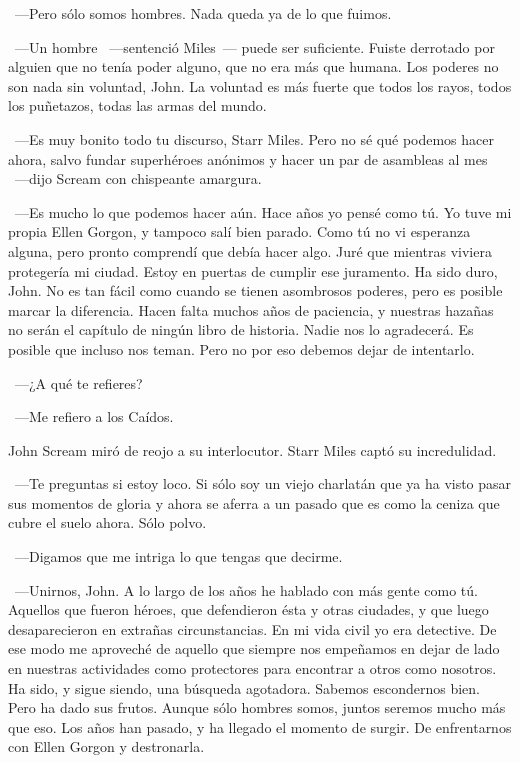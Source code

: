 ~---Pero sólo somos hombres. Nada queda ya de lo que fuimos.

~---Un hombre ~---sentenció Miles~--- puede ser suficiente. Fuiste derrotado por alguien que no tenía poder alguno, que no era más que humana. Los poderes no son nada sin voluntad, John. La voluntad es más fuerte que todos los rayos, todos los puñetazos, todas las armas del mundo.

~---Es muy bonito todo tu discurso, Starr Miles. Pero no sé qué podemos hacer ahora, salvo fundar superhéroes anónimos y hacer un par de asambleas al mes ~---dijo Scream con chispeante amargura.

~---Es mucho lo que podemos hacer aún. Hace años yo pensé como tú. Yo tuve mi propia Ellen Gorgon, y tampoco salí bien parado. Como tú no vi esperanza alguna, pero pronto comprendí que debía hacer algo. Juré que mientras viviera protegería mi ciudad. Estoy en puertas de cumplir ese juramento. Ha sido duro, John. No es tan fácil como cuando se tienen asombrosos poderes, pero es posible marcar la diferencia. Hacen falta muchos años de paciencia, y nuestras hazañas no serán el capítulo de ningún libro de historia. Nadie nos lo agradecerá. Es posible que incluso nos teman. Pero no por eso debemos dejar de intentarlo.

~---¿A qué te refieres?

~---Me refiero a los Caídos.

John Scream miró de reojo a su interlocutor. Starr Miles captó su incredulidad.

~---Te preguntas si estoy loco. Si sólo soy un viejo charlatán que ya ha visto pasar sus momentos de gloria y ahora se aferra a un pasado que es como la ceniza que cubre el suelo ahora. Sólo polvo.

~---Digamos que me intriga lo que tengas que decirme.

~---Unirnos, John. A lo largo de los años he hablado con más gente como tú. Aquellos que fueron héroes, que defendieron ésta y otras ciudades, y que luego desaparecieron en extrañas circunstancias. En mi vida civil yo era detective. De ese modo me aproveché de aquello que siempre nos empeñamos en dejar de lado en nuestras actividades como protectores para encontrar a otros como nosotros. Ha sido, y sigue siendo, una búsqueda agotadora. Sabemos escondernos bien. Pero ha dado sus frutos. Aunque sólo hombres somos, juntos seremos mucho más que eso. Los años han pasado, y ha llegado el momento de surgir. De enfrentarnos con Ellen Gorgon y destronarla.

